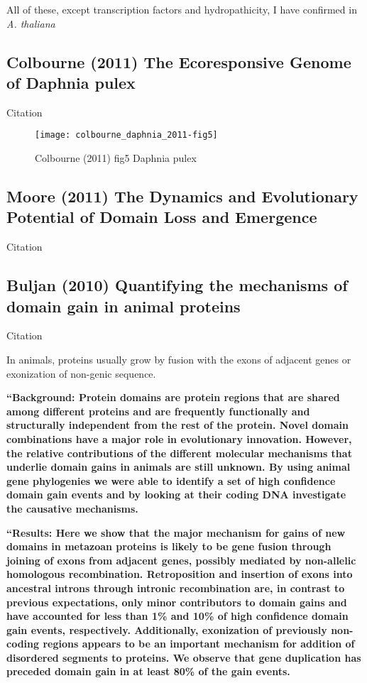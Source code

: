     All of these, except transcription factors and hydropathicity, I have
    confirmed in \textit{A. thaliana}


\subsection{Colbourne (2011) The Ecoresponsive Genome of Daphnia pulex}

    Citation \cite{colbourne_ecoresponsive_2011}

    \begin{figure}[!ht] \centering
        \texttt{[image: colbourne\_daphnia\_2011-fig5]} \caption{
            Colbourne (2011) fig5 Daphnia pulex
            \cite{colbourne_ecoresponsive_2011} } \end{figure}
        \FloatBarrier

\subsection{Moore (2011) The Dynamics and Evolutionary Potential of Domain
Loss and Emergence}

    Citation \cite{moore_dynamics_2011}


\subsection{Buljan (2010) Quantifying the mechanisms of domain gain in animal proteins}
    Citation \cite{buljan_quantifying_2010}

    In animals, proteins usually grow by fusion with the exons of adjacent
    genes or exonization of non-genic sequence.

    \textbf{``Background: Protein domains are protein regions that are shared
        among different proteins and are frequently functionally and
        structurally independent from the rest of the protein. Novel domain
        combinations have a major role in evolutionary innovation. However, the
        relative contributions of the different molecular mechanisms that
        underlie domain gains in animals are still unknown. By using animal
        gene phylogenies we were able to identify a set of high confidence
        domain gain events and by looking at their coding DNA investigate the
        causative mechanisms.}

    \textbf{``Results: Here we show that the major mechanism for gains of new
        domains in metazoan proteins is likely to be gene fusion through
        joining of exons from adjacent genes, possibly mediated by non-allelic
        homologous recombination.  Retroposition and insertion of exons into
        ancestral introns through intronic recombination are, in contrast to
        previous expectations, only minor contributors to domain gains and have
        accounted for less than 1\% and 10\% of high confidence domain gain
        events, respectively.  Additionally, exonization of previously
        non-coding regions appears to be an important mechanism for addition of
        disordered segments to proteins. We observe that gene duplication has
        preceded domain gain in at least 80\% of the gain events.}

